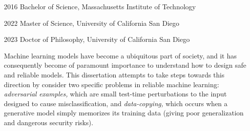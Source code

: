 \documentclass[12pt]{ucsddissertation}
\begin{document}
\begin{vita}
\noindent
\begin{cv}{}
\begin{cvlist}{}
\item[2016] Bachelor of Science, Massachusetts Institute of Technology
\item[2022] Master of Science, University of California San Diego
\item[2023] Doctor of Philosophy, University of California San Diego
\end{cvlist}
\end{cv}


\end{vita}

\begin{dissertationabstract}
Machine learning models have become a ubiquitous part of society, and it has consequently become of paramount importance to understand how to design safe and reliable models. This dissertation attempts to take steps towards this direction by consider two specific problems in reliable machine learning: \textit{adversarial examples,} which are small test-time perturbations to the input designed to cause misclassification, and \textit{data-copying,} which occurs when a generative model simply memorizes its training data (giving poor generalization and dangerous security risks). 
\end{dissertationabstract}
\end{document}
